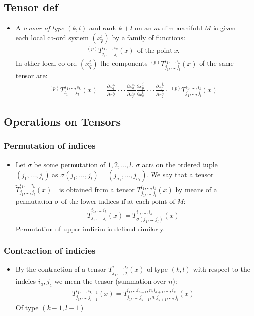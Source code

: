 \documentclass[11pt]{article}
\numberwithin{equation}{section}
\begin{document}
\subsection{Tensor def}
\begin{itemize}
  \item A \emph{tensor of type} $(k,l)$ and rank $k+l$ on an $m$-dim manifold $M$ is given each local co-ord system $(x^i_p)$ by a family of functions:
  \begin{align*}
    ^{(p)}T^{i_1,\ldots,i_k}_{j_1,\ldots,j_l}(x) ~~\text{of the point}~x.
  \end{align*}
  In other local co-ord $(x^i_q)$ the components $^{(p)}T^{i_1,\ldots,i_k}_{j_1,\ldots,j_l}(x)$  of the same tensor are:
  \begin{align*}
    ^{(p)}T^{s_1,\ldots,s_k}_{t_1,\ldots,t_l}(x) = \frac{\partial x^{s_1}_q}{\partial x^{i_1}_p}\cdot \cdot \cdot\frac{\partial x^{s_k}_q}{\partial x^{i_k}_p}\frac{\partial x^{j_1}_p}{\partial x^{t_1}_q}  \cdot \cdot \cdot \frac{\partial x^{j_l}_p}{\partial x^{t_l}_q} \cdot ~^{(p)}T^{i_1,\ldots,i_k}_{j_1,\ldots,j_l}(x)
  \end{align*}
\end{itemize}
\subsection{Operations on Tensors}
\subsubsection{Permutation of indices}
\begin{itemize}
  \item Let $\sigma$ be some permutation of $1,2,\ldots,l$. $\sigma$ acrs on the ordered tuple $(j_1,\ldots,j_l)$ as $\sigma(j_1,\ldots,j_l) = (j_{\sigma_1},\ldots,j_{\sigma_l})$. We say that a tensor $\tilde{T}^{i_1,\ldots,i_k}_{j_1,\ldots,j_l}(x)$ =is obtained from a tensor $T^{i_1,\ldots,i_k}_{j_1,\ldots,j_l}(x)$ by means of a permutation $\sigma$ of the lower indices if at each point of $M$:
  \begin{align*}
    \tilde{T}^{i_1,\ldots,i_k}_{j_1,\ldots,j_l}(x) = T^{i_1,\ldots,i_k}_{\sigma(j_1,\ldots,j_l)}(x)
  \end{align*}
  Permutation of upper indicies is defined similarly. 
\end{itemize}
\subsubsection{Contraction of indicies}
\begin{itemize}
  \item By the contraction of a tensor $T^{i_1,\ldots,i_k}_{j_1,\ldots,j_l}(x)$ of type $(k,l)$ with respect to the indcies $i_a,j_a$ we mean the tensor (summation over $n$):
  \begin{align*}
    T^{i_1,\ldots,i_{k-1}}_{j_1,\ldots,j_{l-1}}(x)=T^{i_1,\ldots i_{a-1},n,i_{a+1},\ldots,i_k}_{j_1,\ldots ,j_{a-1},n,j_{a+1},\ldots,j_l}(x)
  \end{align*}
  Of type $(k-1,l-1)$
\end{itemize}
\end{document}
